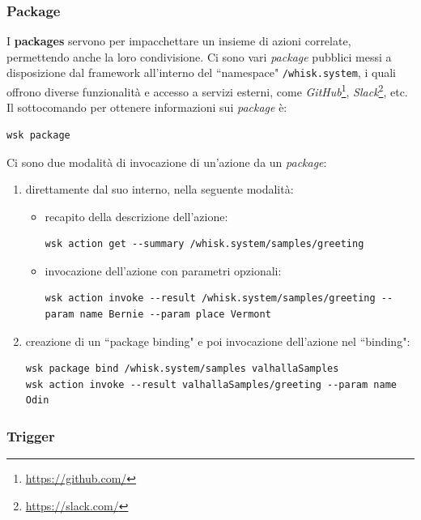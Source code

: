 \documentclass[12pt,a4paper,openany,twoside]{book}
\begin{document}
\subsubsection{Package}

I \textbf{packages} servono per impacchettare un insieme di azioni correlate, permettendo anche la loro condivisione. Ci sono vari \textit{package} pubblici messi a disposizione dal framework all'interno del ``namespace" \texttt{/whisk.system}, i quali offrono diverse funzionalità e accesso a servizi esterni, come \textit{GitHub}\footnote{\url{https://github.com/}}, \textit{Slack}\footnote{\url{https://slack.com/}}, etc.
\newline
Il sottocomando per ottenere informazioni sui \textit{package} è: \begin{lstlisting}
wsk package\end{lstlisting}

\noindent
Ci sono due modalità di invocazione di un'azione da un \textit{package}:
\begin{enumerate}
    \item direttamente dal suo interno, nella seguente modalità:
        \begin{itemize}
            \item recapito della descrizione dell'azione: \begin{lstlisting}
wsk action get --summary /whisk.system/samples/greeting\end{lstlisting}
            \item invocazione dell'azione con parametri opzionali: \begin{lstlisting}
wsk action invoke --result /whisk.system/samples/greeting --param name Bernie --param place Vermont\end{lstlisting}
        \end{itemize}
    
    \item creazione di un ``package binding" e poi invocazione dell'azione nel ``binding":
    \begin{lstlisting}
wsk package bind /whisk.system/samples valhallaSamples
wsk action invoke --result valhallaSamples/greeting --param name Odin\end{lstlisting}
\end{enumerate}

\subsubsection{Trigger}
\end{document}
